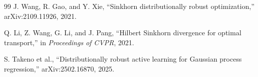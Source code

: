 \documentclass[11pt,a4paper]{article}
\begin{document}
\begin{thebibliography}{99}
J. Wang, R. Gao, and Y. Xie, ``Sinkhorn distributionally robust optimization,'' arXiv:2109.11926, 2021.

Q. Li, Z. Wang, G. Li, and J. Pang, ``Hilbert Sinkhorn divergence for optimal transport,'' in \emph{Proceedings of CVPR}, 2021.

S. Takeno et al., ``Distributionally robust active learning for Gaussian process regression,'' arXiv:2502.16870, 2025.

\end{thebibliography}
\end{document}
